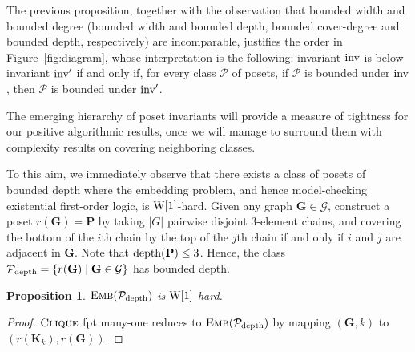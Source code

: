 \documentclass[usletter]{article}
\newcommand{\longversion}[1]{#1}
\newcommand{\shortversion}[1]{}
\newcommand{\longshort}[2]{\longversion{#1}\shortversion{#2}}
\newcommand{\pp}{\mathbf{P}}
\newtheorem{proposition}{Proposition}
\begin{document}
\longversion{\pfdiagram}

The previous proposition, together with the observation 
that bounded width and bounded degree (bounded width and bounded depth, 
bounded cover-degree and bounded depth, respectively) are incomparable, 
justifies the order in Figure~\ref{fig:diagram}, whose interpretation 
is the following: invariant $\textup{inv}$ is below invariant $\textup{inv}'$ 
if and only if, for every class $\mathcal{P}$ of posets, 
if $\mathcal{P}$ is bounded under $\textup{inv}$, 
then $\mathcal{P}$ is bounded under $\textup{inv}'$.

The emerging hierarchy of poset invariants will provide a measure of tightness 
for our positive algorithmic results, once we will manage to 
surround them with complexity results on covering neighboring classes.  

To this aim, we immediately observe that there exists a class of posets of bounded depth 
where the embedding problem, and hence model-checking existential first-order logic, 
is $\textup{W}[1]$-hard.  Given any graph $\mathbf{G} \in \mathcal{G}$, 
construct a poset $r(\mathbf{G})=\pp$ 
by taking $|G|$ pairwise disjoint $3$-element chains, 
and covering the bottom of the $i$th chain by the top of the $j$th chain 
if and only if $i$ and $j$ are adjacent in $\mathbf{G}$.  
Note that $\textup{depth}(\pp) \leq 3$.  Hence, the class 
$\mathcal{P}_{\textup{depth}}=\{ r(\mathbf{G}) \mid \mathbf{G} \in \mathcal{G} \}$ 
has bounded depth.

\begin{proposition}\label{pr:parhardallposets}
$\textsc{Emb}(\mathcal{P}_\textup{depth})$ is $\textup{W}[1]$-hard.
\end{proposition}

\newcommand{\pfparhardallposets}[0]{
\begin{proof}
$\textsc{Clique}$ fpt many-one reduces to $\textsc{Emb}(\mathcal{P}_{\textup{depth}})$ 
by mapping $(\mathbf{G},k)$ to $(r(\mathbf{K}_k),r(\mathbf{G}))$.  
\end{proof}
}

\longshort{\pfparhardallposets}{\pfparhardallposets}
\end{document}
